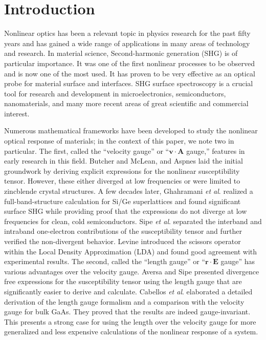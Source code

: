 \section{Introduction}\label{intro}

Nonlinear optics has been a relevant topic in physics research for the past 
fifty years and has gained a wide range of applications in 
many areas of technology and research. In material science,
Second-harmonic generation (SHG) is of particular importance.
It was one of the first nonlinear processes to be observed and is now one
of the most used. It has proven to be very effective as an 
optical probe for material surface and interfaces. 
\cite{hughesPRB96, 
     guyot-sionnestPRB88, 
     lupkeSSR99, 
     downerPSSA01, 
     shenAPB99, 
     shenNAT89, 
     chenPRL81, 
     maytorenaPRB98}
SHG surface spectroscopy is a crucial tool for research and development
in microelectronics, semiconductors, nanomaterials, and many more recent 
areas of great scientific and commercial interest.

Numerous mathematical frameworks have been developed to study the 
nonlinear optical response of materials; 
in the context of this paper, we note two in particular. 
The first, called the ``velocity gauge'' or 
``$\mathbf{v}\cdot\mathbf{A}$ gauge,'' features in early 
research in this field. 
Butcher and McLean\cite{butcherPOPS63}, and 
Aspnes\cite{aspnesPRB72} 
laid the initial groundwork by deriving explicit expressions for the 
nonlinear susceptibility tensor. However, these either diverged at 
low frequencies or were limited to zincblende crystal structures. 
A few decades later, 
Ghahramani \emph{et al}.\cite{ghahramaniPRB91} 
realized a full-band-structure calculation for Si/Ge superlattices and 
found significant surface SHG while providing proof that the expressions 
do not diverge at low frequencies for clean, cold semiconductors. 
Sipe \emph{et al}.\cite{sipePRB93}
separated the interband and intraband one-electron contributions 
of the susceptibility tensor and further verified the non-divergent behavior. 
Levine\cite{levinePRB94} 
introduced the scissors operator within the Local Density Approximation
(LDA) and found good agreement with experimental results. 
The second, called the ``length gauge'' or 
``$\mathbf{r}\cdot\mathbf{E}$ gauge'' has various advantages over 
the velocity gauge. 
Aversa and Sipe\cite{aversaPRB95} 
presented divergence free expressions for the susceptibility tensor using 
the length gauge that are significantly easier to derive and calculate. 
Cabellos \emph{et al}.\cite{cabellosPRB09} 
elaborated a detailed derivation of the length gauge 
formalism and a comparison with the velocity gauge for bulk GaAs. They 
proved that the results are indeed gauge-invariant. 
This presents a strong case for using the length over the velocity gauge 
for more generalized and less expensive calculations of the nonlinear
response of a system.

